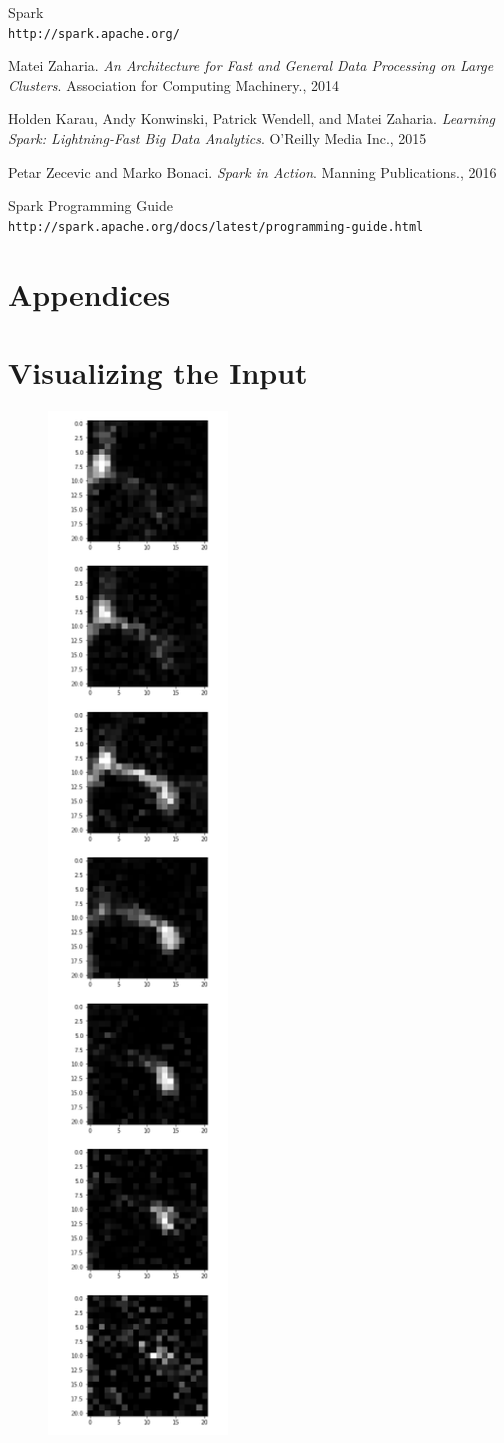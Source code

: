 \documentclass{neu_handout}
\begin{document}
\begin{thebibliography}{9}
Spark
\\\texttt{http://spark.apache.org/}


 Matei Zaharia. \textsl{An Architecture for Fast and General Data Processing on
Large Clusters}. Association for Computing Machinery., 2014

 Holden Karau, Andy Konwinski, Patrick Wendell, and Matei Zaharia. \textsl{Learning Spark: Lightning-Fast Big Data Analytics}. O'Reilly Media Inc., 2015

 Petar Zecevic and Marko Bonaci. \textsl{Spark in Action}. Manning
Publications., 2016

Spark Programming Guide
\\\texttt{http://spark.apache.org/docs/latest/programming-guide.html}

\end{thebibliography}

\newpage

\appendix
\section*{Appendices}

\section{Visualizing the Input}

\begin{figure}[!h]
  \includegraphics[width=0.15\linewidth]{neuron-slices}
  \label{fig:neuron-slices}
\end{figure}
\end{document}
